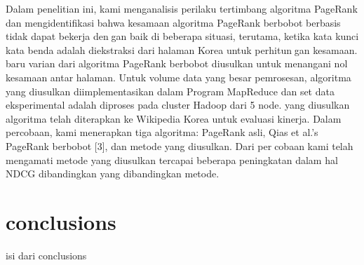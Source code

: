 \documentclass[conference]{IEEEtran}
\begin{document}
Dalam penelitian ini, kami menganalisis perilaku tertimbang
algoritma PageRank dan mengidentifikasi bahwa kesamaan
algoritma PageRank berbobot berbasis tidak dapat bekerja dengan baik di beberapa situasi, terutama, ketika kata kunci kata
benda adalah diekstraksi dari halaman Korea untuk perhitungan kesamaan. baru varian dari algoritma PageRank berbobot
diusulkan untuk menangani nol kesamaan antar halaman.
Untuk volume data yang besar pemrosesan, algoritma yang
diusulkan diimplementasikan dalam Program MapReduce dan
set data eksperimental adalah diproses pada cluster Hadoop
dari 5 node. yang diusulkan algoritma telah diterapkan ke
Wikipedia Korea untuk evaluasi kinerja. Dalam percobaan,
kami menerapkan tiga algoritma: PageRank asli, Qias et al.’s
PageRank berbobot [3], dan metode yang diusulkan. Dari percobaan kami telah mengamati metode yang diusulkan tercapai
beberapa peningkatan dalam hal NDCG dibandingkan yang
dibandingkan metode.

\section{conclusions}
isi dari conclusions



\end{document}
